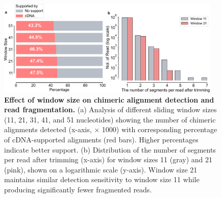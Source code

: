 \documentclass[pdflatex,sn-nature, lineno]{sn-jnl}%
\begin{document}
\begin{figure}
    \begin{center}
        \includegraphics[width=0.95\textwidth]{finals/slidewindow}
    \end{center}
    \caption{ {\bf Effect of window size on chimeric alignment detection and read fragmentation.}
        (a) Analysis of different sliding window sizes (11, 21, 31, 41, and 51
        nucleotides) showing the number of chimeric alignments detected (x-axis, ×
        1000) with corresponding percentage of cDNA-supported alignments (red bars).
        Higher percentages indicate better support. (b) Distribution of the number
        of segments per read after trimming (x-axis) for window sizes 11 (gray)
        and 21 (pink), shown on a logarithmic scale (y-axis). Window size 21
        maintains similar detection sensitivity to window size 11 while producing
        significantly fewer fragmented reads.}
    \label{fig:slidewindow}
\end{figure}






\end{document}
